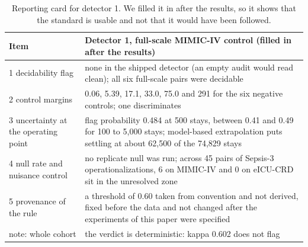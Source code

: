 \documentclass[10pt]{article}
\theoremstyle{definition}
\begin{document}
\begin{table}[h]
\centering\footnotesize
\begin{tabular}{@{}p{3.4cm}p{9.4cm}@{}}
\toprule
Item & Detector 1, full-scale MIMIC-IV control (filled in after the results)\\
\midrule
1 decidability flag & none in the shipped detector (an empty audit would read clean); all six full-scale pairs were decidable\\
2 control margins & 0.06, 5.39, 17.1, 33.0, 75.0 and 291 for the six negative controls; one discriminates\\
3 uncertainty at the operating point & flag probability 0.484 at 500 stays, between 0.41 and 0.49 for 100 to 5,000 stays; model-based extrapolation puts settling at about 62,500 of the 74,829 stays\\
4 null rate and nuisance control & no replicate null was run; across 45 pairs of Sepsis-3 operationalizations, 6 on MIMIC-IV and 0 on eICU-CRD sit in the unresolved zone\\
5 provenance of the rule & a threshold of 0.60 taken from convention and not derived, fixed before the data and not changed after the experiments of this paper were specified\\
note: whole cohort & the verdict is deterministic: kappa 0.602 does not flag\\
\bottomrule
\end{tabular}
\caption{Reporting card for detector 1. We filled it in after the results, so it shows that the standard is usable and not that it would have been followed.}
\label{tab:card}
\end{table}
\end{document}
